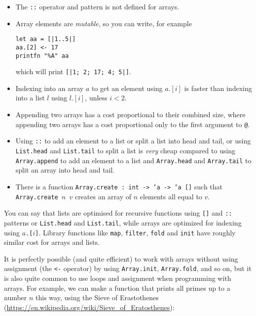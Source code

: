 \documentclass[a4paper]{article}
\begin{document}
\begin{itemize}
\item The \texttt{::} operator and pattern is not defined for arrays.
\item Array elements are \emph{mutable}, so you can write, for example

\begin{verbatim}
let aa = [|1..5|]
aa.[2] <- 17
printfn "%A" aa
\end{verbatim}

\noindent
which will print \texttt{[|1; 2; 17; 4; 5|]}.

\item Indexing into an array $a$ to get an element using $a.[i]$ is faster
  than indexing into a list $l$ using $l.[i]$, unless $i<2$.

\item Appending two arrays has a cost proportional to their combined
  size, where appending two arrays has a cost proportional only to the
  first argument to \texttt{@}.

\item Using \texttt{::} to add an element to a list or split a list
  into head and tail, or using \texttt{List.head} and
  \texttt{List.tail} to split a list is \emph{very} cheap compared to
  using \texttt{Array.append} to add an element to a list and
  \texttt{Array.head} and \texttt{Array.tail} to split an array into
  head and tail.

\item There is a function \texttt{Array.create : int -> 'a -> 'a []}
  such that \texttt{Array.create $n$ $v$} creates an array of $n$
  elements all equal to $v$.

\end{itemize}

\noindent
You can say that lists are optimised for recursive functions using
\texttt{[]} and \texttt{::} patterns or \texttt{List.head} and
\texttt{List.tail}, while arrays are optimized for indexing using
\texttt{$a$.[$i$]}.  Library functions like \texttt{map},
\texttt{filter}, \texttt{fold} and \texttt{init} have roughly similar
cost for arrays and lists.

It is perfectly possible (and quite efficient) to work with arrays
without using assignment (the \texttt{<-} operator) by using
\texttt{Array.init}, \texttt{Array.fold}, and so on, but it is also
quite common to use loops and assignment when programming with arrays.
For example, we can make a function that prints all primes up to a
number $n$ this way, using the Sieve of Erastothenes
(\url{https://en.wikipedia.org/wiki/Sieve_of_Eratosthenes}):
\end{document}
